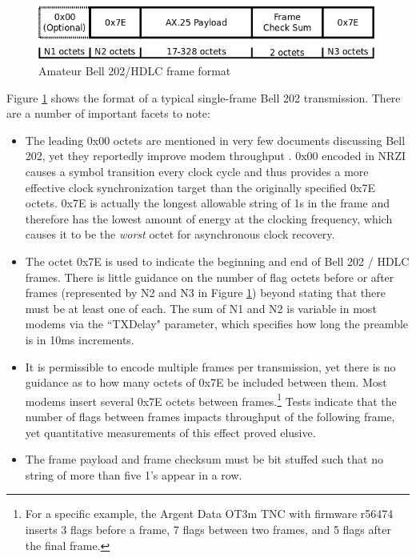 \documentclass[12pt,letterpaper]{article}
\begin{document}
\begin{figure}
	\centering
	\includegraphics[width=1.0\textwidth]{src/dia/bell202}
	\caption{Amateur Bell 202/HDLC frame format}
	\label{fig:bell202format}
\end{figure}

Figure \ref{fig:bell202format} shows the format of a typical single-frame
Bell 202 transmission. There are a number of important facets to note:
\begin{itemize}
	\item The leading 0x00 octets are mentioned in very few documents
		discussing Bell 202, yet they reportedly improve modem
		throughput \cite{millerinterview}\cite{aprsunveiled}. 
		0x00 encoded in NRZI causes a symbol transition
		every clock cycle and thus provides a more effective clock 
		synchronization target than the originally specified 0x7E octets. 
		0x7E is actually 
		the longest allowable string of 1s in the frame and 
		therefore has the lowest amount of energy at the clocking frequency,
		which causes it to be the \emph{worst} 
		octet for asynchronous clock recovery.
	\item The octet 0x7E is used to indicate the beginning and end of 
		Bell 202 / HDLC frames.
		There is little guidance on the number of flag octets before
		or after frames (represented by N2 and N3 in 
		Figure \ref{fig:bell202format})
		beyond stating that there must be at least one of each. The sum of
		N1 and N2 is variable in most modems via the ``TXDelay" parameter,
		which specifies how long the preamble is in 10ms increments.
	\item It is permissible to encode multiple 
		frames per transmission, yet there is no guidance as to how
		many octets of 0x7E be included between them.
		Most modems insert several 0x7E octets between 
		frames.\footnote{For a specific example, the Argent Data OT3m TNC 
			with firmware r56474 inserts 3 flags before
		a frame, 7 flags between two frames, and 5 flags after the final frame.}
		Tests indicate that the number of flags between frames 
		impacts throughput of the following frame, yet
		quantitative measurements of this effect proved elusive.
	\item The frame payload and frame checksum must be bit stuffed such 
		that no string of more than five 1's appear in a row.

\end{itemize}
\end{document}

